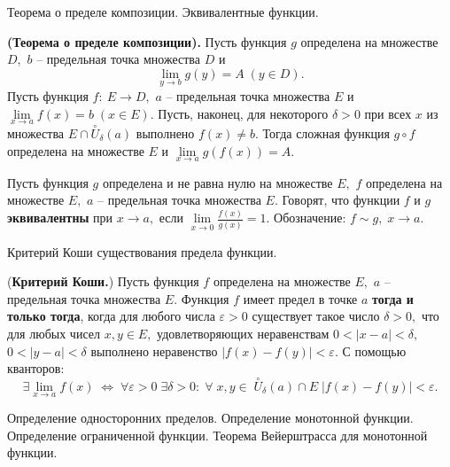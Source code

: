 \newpage
\begin{problem}
Теорема о пределе композиции. Эквивалентные функции.
\end{problem}

\begin{theorem} \textbf{(Теорема о пределе композиции).}
	Пусть функция $g$ определена на множестве $D,$
	$b$ -- предельная точка множества $D$ и
	$$
		\lim\limits_{y\rightarrow b}g(y)=A\;(y\in D).
	$$
	Пусть функция $f: \ E\rightarrow D,$
	$a$ -- предельная точка множества $E$ и
	$\lim\limits_{x\rightarrow a}f(x)=b\;(x\in E).$
	Пусть, наконец, для некоторого $\delta>0$
	при всех $x$ из множества
	$E\cap\stackrel{\circ}{U}_{\delta}(a)$
	выполнено $f(x)\neq b.$
	Тогда сложная функция $g\circ f$ определена
	на множестве $E$ и
	$\lim\limits_{x\rightarrow a}g(f(x))=A.$
\end{theorem}

\begin{definition}
	Пусть функция $g$ определена и не равна нулю
	на множестве $E,$
	$f$ определена на множестве
	$E,$ $a$ -- предельная точка множества
	$E.$ Говорят, что функции $f$ и $g$
	\textbf{эквивалентны} при $x\rightarrow a,$
	если $\lim\limits_{x\rightarrow0}
		\frac{f(x)}{g(x)}=1.$ Обозначение:
	$f\sim g,\;x\rightarrow a.$
\end{definition}
\newpage
\begin{problem}
Критерий Коши существования предела функции.
\end{problem}

\begin{theorem} (\textbf{Критерий Коши.})
	Пусть функция $f$ определена на множестве $E,$
	$a$ -- предельная точка множества $E.$
	Функция $f$ имеет предел в точке $a$
	\textbf{тогда и только тогда}, когда для любого
	числа $\varepsilon>0$ существует такое число
	$\delta>0,$ что для любых чисел $x, y \in E,$
	удовлетворяющих неравенствам $0<|x-a|<\delta,$
	$0<|y-a|<\delta$ выполнено неравенство $|f(x)-
		f(y)|<\varepsilon.$ С помощью кванторов:
	$$\exists \lim\limits_{x\rightarrow a}f(x)\;
		\Leftrightarrow\;\forall \varepsilon > 0\;
		\exists \delta >0 :\;\forall \;x, y \in\;
		\stackrel{\circ}{U}_{\delta}(a) \cap E\;
		|f(x) - f(y)| < \varepsilon.
	$$
\end{theorem}

\newpage
\begin{problem}
Определение односторонних пределов. Определение монотонной функции. Определение ограниченной функции. Теорема Вейерштрасса для монотонной функции.
\end{problem}

